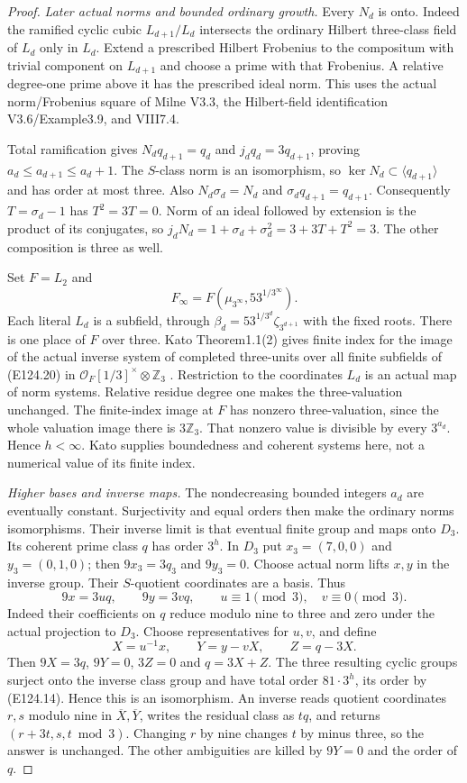 \begin{proof}
\emph{Later actual norms and bounded ordinary growth.}
Every $N_d$ is onto. Indeed the ramified cyclic cubic
$L_{d+1}/L_d$ intersects the ordinary Hilbert three-class
field of $L_d$ only in $L_d$. Extend a prescribed Hilbert
Frobenius to the compositum with trivial component on
$L_{d+1}$ and choose a prime with that Frobenius. A relative
degree-one prime above it has the prescribed ideal norm.
This uses the actual norm/Frobenius square of Milne V3.3,
the Hilbert-field identification V3.6/Example3.9, and VIII7.4.

Total ramification gives $N_dq_{d+1}=q_d$ and
$j_dq_d=3q_{d+1}$, proving
$a_d\le a_{d+1}\le a_d+1$.
The $S$-class norm is an isomorphism, so
$\ker N_d\subset\langle q_{d+1}\rangle$ and has order at
most three. Also $N_d\sigma_d=N_d$ and
$\sigma_dq_{d+1}=q_{d+1}$. Consequently $T=\sigma_d-1$
has $T^2=3T=0$. Norm of an ideal followed by extension is
the product of its conjugates, so
$j_dN_d=1+\sigma_d+\sigma_d^2=3+3T+T^2=3$.
The other composition is three as well.

Set $F=L_2$ and
\[
 F_\infty=F(\mu_{3^\infty},53^{1/3^\infty}).
 \tag{E124.20}
\]
Each literal $L_d$ is a subfield, through
$\beta_d=53^{1/3^d}\zeta_{3^{d+1}}$ with the fixed roots.
There is one place of $F$ over three. Kato Theorem1.1(2)
gives finite index for the image of the actual inverse
system of completed three-units over all finite subfields
of (E124.20) in
$\mathcal O_F[1/3]^\times\otimes\mathbb Z_3$
\cite{E_KatoUniversalNorms}. Restriction to the coordinates
$L_d$ is an actual map of norm systems. Relative residue
degree one makes the three-valuation unchanged. The
finite-index image at $F$ has nonzero three-valuation, since
the whole valuation image there is $3\mathbb Z_3$.
That nonzero value is divisible by every $3^{a_d}$.
Hence $h<\infty$. Kato supplies boundedness and coherent
systems here, not a numerical value of its finite index.

\emph{Higher bases and inverse maps.}
The nondecreasing bounded integers $a_d$ are eventually
constant. Surjectivity and equal orders then make the
ordinary norms isomorphisms. Their inverse limit is that
eventual finite group and maps onto $D_3$. Its coherent
prime class $q$ has order $3^h$. In $D_3$ put
$x_3=(7,0,0)$ and $y_3=(0,1,0)$; then
$9x_3=3q_3$ and $9y_3=0$.
Choose actual norm lifts $x,y$ in the inverse group.
Their $S$-quotient coordinates are a basis. Thus
\[
 9x=3u q,\qquad9y=3v q,\qquad
 u\equiv1\pmod3,\quad v\equiv0\pmod3.
 \tag{E124.21}
\]
Indeed their coefficients on $q$ reduce modulo nine to
three and zero under the actual projection to $D_3$.
Choose representatives for $u,v$, and define
\[
 X=u^{-1}x,\qquad Y=y-vX,\qquad Z=q-3X.
 \tag{E124.22}
\]
Then $9X=3q$, $9Y=0$, $3Z=0$ and $q=3X+Z$.
The three resulting cyclic groups surject onto the inverse
class group and have total order $81\cdot3^h$, its order
by (E124.14). Hence this is an isomorphism.
An inverse reads quotient coordinates $r,s$ modulo nine
in $\overline X,\overline Y$, writes the residual class
as $tq$, and returns $(r+3t,s,t\bmod3)$.
Changing $r$ by nine changes $t$ by minus three, so the
answer is unchanged. The other ambiguities are killed
by $9Y=0$ and the order of $q$.


\end{proof}
